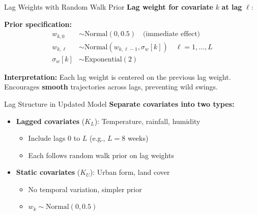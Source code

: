 \documentclass[aspectratio=169]{beamer}
\begin{document}
\begin{frame}{Lag Weights with Random Walk Prior}
  \textbf{Lag weight for covariate } $k$ \textbf{ at lag } $\ell$:
  
  \vspace{0.5cm}
  
  \textbf{Prior specification:}
  \begin{align*}
    w_{k,0} &\sim \text{Normal}(0, 0.5) \quad \text{(immediate effect)} \\
    w_{k,\ell} &\sim \text{Normal}(w_{k,\ell-1}, \sigma_w[k]) \quad \ell = 1, \ldots, L \\
    \sigma_w[k] &\sim \text{Exponential}(2)
  \end{align*}
  
  \vspace{1cm}
  
  \textbf{Interpretation:} Each lag weight is centered on the previous lag weight. Encourages \textbf{smooth} trajectories across lags, preventing wild swings.
\end{frame}

\begin{frame}{Lag Structure in Updated Model}
  \textbf{Separate covariates into two types:}
  
  \begin{itemize}
    \item \textbf{Lagged covariates } ($K_L$): Temperature, rainfall, humidity
      \begin{itemize}
        \item Include lags 0 to $L$ (e.g., $L=8$ weeks)
        \item Each follows random walk prior on lag weights
      \end{itemize}
    \item \textbf{Static covariates } ($K_U$): Urban form, land cover
      \begin{itemize}
        \item No temporal variation, simpler prior
        \item $w_k \sim \text{Normal}(0, 0.5)$
      \end{itemize}
  \end{itemize}
\end{frame}
\end{document}
